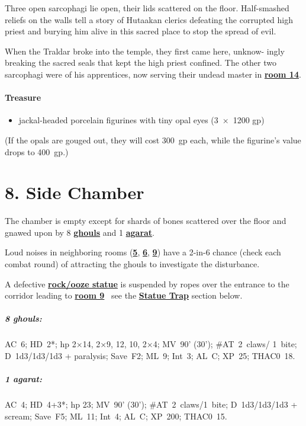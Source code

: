 \documentclass[english,11pt,openany,letterpaper,twocolumn]{book}
\begin{document}
Three open sarcophagi lie open, their lids scattered on the floor. Half-smashed reliefs on the walls tell a story of Hutaakan clerics defeating the corrupted high priest and burying him alive in this sacred place to stop the spread of evil.

\tab When the Traldar broke into the temple, they first came here, unknow- ingly breaking the sacred seals that kept the high priest confined. The other two sarcophagi were of his apprentices, now serving their undead master in \hyperlink{room14}{\textbf{room 14}}.

\skipline
\paragraph{Treasure}
\begin{itemize}[leftmargin=*]
	\item jackal-headed porcelain figurines with tiny opal eyes (3~×~1200 gp)
\end{itemize}

(If the opals are gouged out, they will cost 300~gp each, while the figurine's value drops to 400~gp.)


\hypertarget{room8}{}
\section{8. Side Chamber}

The chamber is empty except for shards of bones scattered over the floor and gnawed upon by 8 \hyperlink{ghoul}{\textbf{ghouls}} and 1 \hyperlink{agarat}{\textbf{agarat}}.

\tab Loud noises in neighboring rooms (\hyperlink{room5}{\textbf{5}}, \hyperlink{room6}{\textbf{6}}, \hyperlink{room9}{\textbf{9}}) have a 2-in-6 chance (check each combat round) of attracting the ghouls to investigate the disturbance.

\tab A defective \hyperlink{statue}{\textbf{rock/ooze statue}} is suspended by ropes over the entrance to the corridor leading to \hyperlink{room9}{\textbf{room 9}} \dash\ see the \hyperlink{statue-trap}{\textbf{Statue Trap}} section below.

\begin{textbox}
	\subparagraph{8 ghouls:} AC~6; HD~2*; hp 2×14, 2×9, 12, 10, 2×4; MV~90' (30'); \#AT~2~claws/ 1~bite; D~1d3/1d3/1d3 + paralysis; Save~F2; ML~9; Int~3; AL~C; XP~25; THAC0~18.
	
	\subparagraph{1 agarat:} AC~4; HD~4+3*; hp 23; MV~90' (30'); \#AT~2~claws/1~bite; D~1d3/1d3/1d3 + scream; Save~F5; ML~11; Int~4; AL~C; XP~200; THAC0~15.
\end{textbox}
\end{document}
